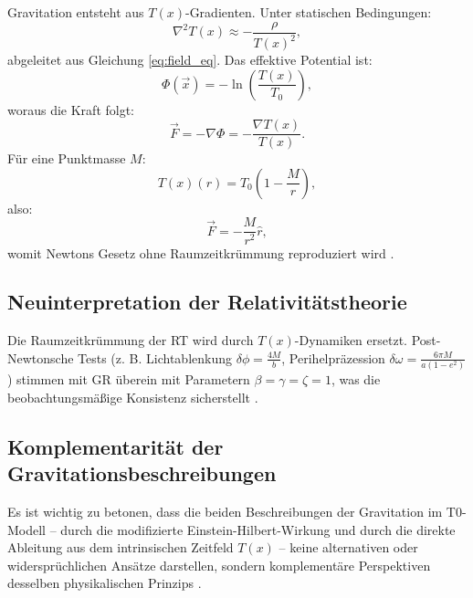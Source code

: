 \documentclass[12pt,a4paper]{article}
\newcommand{\Tfield}{T(x)}
\newcommand{\Tzero}{T_0}
\newcommand{\vecx}{\vec{x}}
\begin{document}
	Gravitation entsteht aus \(\Tfield\)-Gradienten. Unter statischen Bedingungen:
	\begin{equation}
		\nabla^2\Tfield \approx -\frac{\rho}{\Tfield^2},
		\label{eq:static_field}
	\end{equation}
	abgeleitet aus Gleichung \ref{eq:field_eq}. Das effektive Potential ist:
	\begin{equation}
		\Phi(\vecx) = -\ln\left(\frac{\Tfield}{\Tzero}\right),
		\label{eq:grav_potential_def}
	\end{equation}
	woraus die Kraft folgt:
	\begin{equation}
		\vec{F} = -\nabla\Phi = -\frac{\nabla\Tfield}{\Tfield}.
		\label{eq:force_from_potential}
	\end{equation}
	Für eine Punktmasse \(M\):
	\begin{equation}
		\Tfield(r) = \Tzero\left(1 - \frac{M}{r}\right),
		\label{eq:time_field_point_mass}
	\end{equation}
	also:
	\begin{equation}
		\vec{F} = -\frac{M}{r^2} \hat{r},
		\label{eq:newton_law}
	\end{equation}
	womit Newtons Gesetz ohne Raumzeitkrümmung reproduziert wird \cite{pascher_emergente_2025}.
	
	\subsection{Neuinterpretation der Relativitätstheorie}
	\label{subsec:rt_reinterpretation}
	
	Die Raumzeitkrümmung der RT wird durch \(\Tfield\)-Dynamiken ersetzt. Post-Newtonsche Tests (z. B. Lichtablenkung \(\delta\phi = \frac{4M}{b}\), Perihelpräzession \(\delta\omega = \frac{6\pi M}{a(1-e^2)}\)) stimmen mit GR überein mit Parametern \(\beta = \gamma = \zeta = 1\), was die beobachtungsmäßige Konsistenz sicherstellt \cite{Will2014}.
\subsection{Komplementarität der Gravitationsbeschreibungen}
\label{subsec:grav_complementarity}

Es ist wichtig zu betonen, dass die beiden Beschreibungen der Gravitation im T0-Modell – durch die modifizierte Einstein-Hilbert-Wirkung und durch die direkte Ableitung aus dem intrinsischen Zeitfeld $\Tfield$ – keine alternativen oder widersprüchlichen Ansätze darstellen, sondern komplementäre Perspektiven desselben physikalischen Prinzips \cite{pascher_emergente_de_2025}. 
\end{document}
